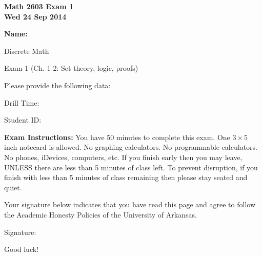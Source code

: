 \documentclass[11pt,letterpaper]{article}
\begin{document}
\flushleft
\begin{multicols}{2}

\begin{large}\textbf{Math 2603 Exam 1 \\
Wed 24 Sep 2014}\end{large}

\hfill\textbf{Name:  }\underline{\hspace{40ex}} %
\\
\vspace{.5in}

\end{multicols}

\pagestyle{empty}

\vspace{4pc}

\begin{center}\LARGE Discrete Math

Exam 1 (Ch. 1-2: Set theory, logic, proofs) \end{center}

\vspace{2pc}
Please provide the following data:

\vspace{2pc}
Drill Time: \underline{\hspace{40ex}}

\vspace{2pc}
Student ID: \underline{\hspace{40ex}}

\vspace{3pc}
{\bf Exam Instructions:} You have 50 minutes to complete this exam.  One $3\times 5$ inch notecard is allowed.  No graphing calculators.  No programmable calculators.  No phones, iDevices, computers, etc.  If you finish early then you may leave, UNLESS there are less than 5 minutes of class left.  To prevent disruption, if you finish with less than 5 minutes of class remaining then please stay seated and quiet.

\vspace{5pc}
Your signature below indicates that you have read this page and agree to follow the Academic Honesty Policies of the University of Arkansas.  

\vspace{3pc}
Signature: \underline{\hspace{80ex}}

\vfill
\begin{flushright}\Large Good luck!\end{flushright}
\end{document}
